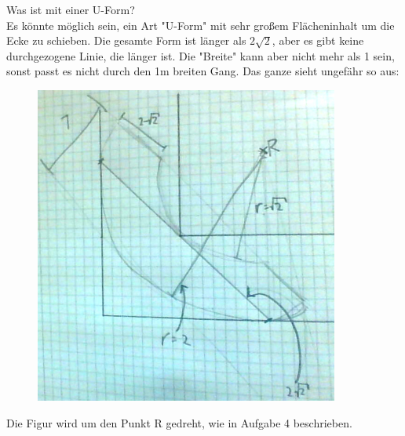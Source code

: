\documentclass[a4paper,11pt]{article}
\begin{document}
Was ist mit einer U-Form?\\
Es könnte möglich sein, ein Art "U-Form" mit sehr großem Flächeninhalt um die Ecke zu schieben. Die gesamte Form ist länger als $2\sqrt{2}$, aber es gibt keine durchgezogene Linie, die länger ist. Die "Breite" kann aber nicht mehr als 1 sein, sonst passt es nicht durch den 1m breiten Gang. Das ganze sieht ungefähr so aus:
\begin{figure}[H] 
        \centering
        \includegraphics[width=10cm]{img/FA_2.jpg}
\end{figure}
Die Figur wird um den Punkt R gedreht, wie in Aufgabe 4 beschrieben.
\end{document}
